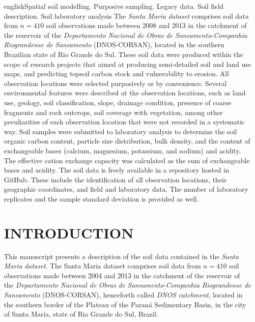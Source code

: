 \def\enkeys{Spatial soil modelling. Purposive sampling. Legacy data. Soil field description. Soil laboratory 
analysis}
  
\begin{chapterabstract}{english}{\enkeys}
The \emph{Santa Maria dataset} comprises soil data from $n = 410$ soil observations made between \num{2008} 
and \num{2013} in the catchment of the reservoir of the \textit{Departamento Nacional de Obras de 
Saneamento}-\textit{Companhia Riograndense de Saneamento} (DNOS-CORSAN), located in the southern Brazilian 
state of Rio Grande do Sul. These soil data were produced within the scope of research projects that aimed at 
producing semi-detailed soil and land use maps, and predicting topsoil carbon stock and vulnerability to 
erosion. All observation locations were selected purposively or by convenience. Several environmental 
features were described at the observation locations, such as land use, geology, soil classification, slope, 
drainage condition, presence of coarse fragments and rock outcrops, soil coverage with vegetation, among 
other peculiarities of each observation location that were not recorded in a systematic way. Soil samples were 
submitted to laboratory analysis to determine the soil organic carbon content, particle size distribution, 
bulk density, and the content of exchangeable bases (calcium, magnesium, potassium, and sodium) and acidity. 
The effective cation exchange capacity was calculated as the sum of exchangeable bases and acidity. The soil 
data is freely available in a repository hosted in GitHub. These include the identification of all observation 
locations, their geographic coordinates, and field and laboratory data. The number of laboratory replicates 
and the sample standard deviation is provided as well.
\end{chapterabstract}

\formatchapter

\section{INTRODUCTION}
\label{sec:chap04-introduction}

This manuscript presents a description of the soil data contained in the \emph{Santa Maria dataset}. The Santa 
Maria dataset comprises soil data from $n = 410$ soil observations made between \num{2004} and \num{2013} in 
the catchment of the reservoir of the \textit{Departamento Nacional de Obras de Saneamento}-\textit{Companhia 
Riograndense de Saneamento} (DNOS-CORSAN), henceforth called \emph{DNOS catchment}, located in the southern 
border of the Plateau of the Paraná Sedimentary Basin, in the city of Santa Maria, state of Rio Grande do Sul, 
Brazil.

